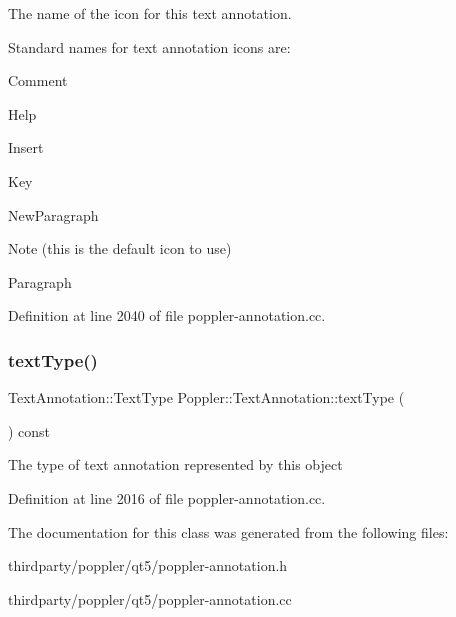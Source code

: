 The name of the icon for this text annotation.

Standard names for text annotation icons are\+:
\begin{DoxyItemize}
\item Comment
\item Help
\item Insert
\item Key
\item New\+Paragraph
\item Note (this is the default icon to use)
\item Paragraph 
\end{DoxyItemize}

Definition at line 2040 of file poppler-\/annotation.\+cc.

\mbox{\label{class_poppler_1_1_text_annotation_a6ef10f14b9adf144fe46f9266daa402e}} 
\subsubsection{\texorpdfstring{text\+Type()}{textType()}}
{\footnotesize\ttfamily Text\+Annotation\+::\+Text\+Type Poppler\+::\+Text\+Annotation\+::text\+Type (\begin{DoxyParamCaption}{ }\end{DoxyParamCaption}) const}

The type of text annotation represented by this object 

Definition at line 2016 of file poppler-\/annotation.\+cc.



The documentation for this class was generated from the following files\+:\begin{DoxyCompactItemize}
\item 
thirdparty/poppler/qt5/poppler-\/annotation.\+h\item 
thirdparty/poppler/qt5/poppler-\/annotation.\+cc\end{DoxyCompactItemize}
